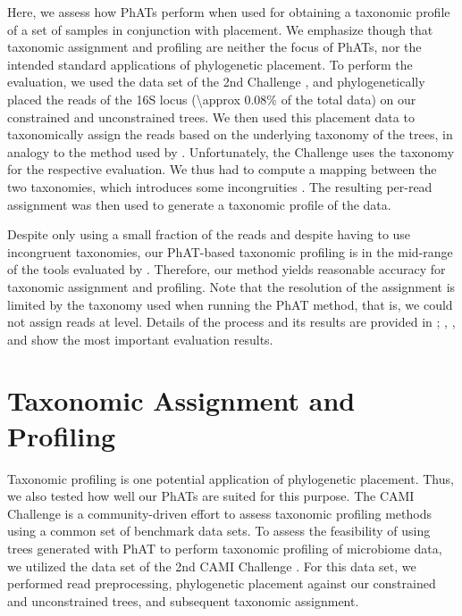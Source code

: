 Here, we assess how \acp{PhAT} perform when used for obtaining a taxonomic profile of a set of samples in conjunction with placement.
We emphasize though that taxonomic assignment and profiling are neither the focus of \acp{PhAT},
nor the intended standard applications of phylogenetic placement.
To perform the evaluation,
we used the  data set of the 2nd  Challenge \citep{Sczyrba2017,Bremges2018},
and phylogenetically placed the reads of the  16S locus (\num{\approx 0.08}\% of the total data)
on our constrained and unconstrained  trees.
We then used this placement data to taxonomically assign the reads
based on the underlying  taxonomy of the trees,
in analogy to the method used by  \citep{Kozlov2016}.
Unfortunately, the  Challenge uses the  taxonomy for the respective evaluation.
We thus had to compute a mapping between the two taxonomies, which introduces some incongruities \citep{Balvociute2017}.
The resulting per-read assignment was then used to generate a taxonomic profile of the data.

Despite only using a small fraction of the reads and despite having to use incongruent taxonomies,
our PhAT-based taxonomic profiling is in the mid-range of the tools evaluated by .
Therefore, our method yields reasonable accuracy for taxonomic assignment and profiling.
Note that the resolution of the assignment is limited by the taxonomy used when running the \ac{PhAT} method,
that is, we could not assign reads at  level.
Details of the process and its results are provided in ;
, , and  show the most important evaluation results.


\section{Taxonomic Assignment and Profiling}
\label{sec:Results:sub:TaxonomicAssignmentProfilingDetails}

Taxonomic profiling is one potential application of phylogenetic placement.
Thus, we also tested how well our \acp{PhAT} are suited for this purpose.
The CAMI Challenge \citep{Sczyrba2017} is a community-driven effort to assess taxonomic profiling methods
using a common set of benchmark data sets.
To assess the feasibility of using trees generated with \ac{PhAT} to perform taxonomic profiling of microbiome data,
we utilized the  data set of the 2nd CAMI Challenge \citep{Bremges2018}.
For this data set, we performed read preprocessing, phylogenetic placement
against our constrained and unconstrained  trees,
and subsequent taxonomic assignment.

